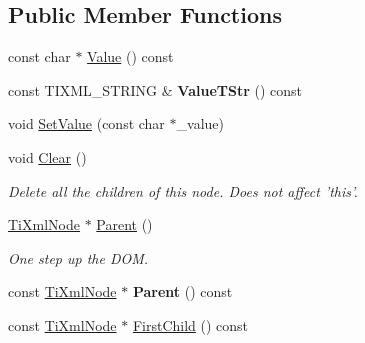 \subsection*{Public Member Functions}
\begin{DoxyCompactItemize}
\item 
const char $\ast$ \hyperlink{class_ti_xml_node_a77943eb90d12c2892b1337a9f5918b41}{Value} () const 
\item 
\hypertarget{class_ti_xml_node_a83ece13d2ea66dac66e0b21332229239}{const T\-I\-X\-M\-L\-\_\-\-S\-T\-R\-I\-N\-G \& {\bfseries Value\-T\-Str} () const }\label{class_ti_xml_node_a83ece13d2ea66dac66e0b21332229239}

\item 
void \hyperlink{class_ti_xml_node_a2a38329ca5d3f28f98ce932b8299ae90}{Set\-Value} (const char $\ast$\-\_\-value)
\item 
\hypertarget{class_ti_xml_node_a708e7f953df61d4d2d12f73171550a4b}{void \hyperlink{class_ti_xml_node_a708e7f953df61d4d2d12f73171550a4b}{Clear} ()}\label{class_ti_xml_node_a708e7f953df61d4d2d12f73171550a4b}

\begin{DoxyCompactList}\small\item\em Delete all the children of this node. Does not affect 'this'. \end{DoxyCompactList}\item 
\hypertarget{class_ti_xml_node_ab643043132ffd794f8602685d34a982e}{\hyperlink{class_ti_xml_node}{Ti\-Xml\-Node} $\ast$ \hyperlink{class_ti_xml_node_ab643043132ffd794f8602685d34a982e}{Parent} ()}\label{class_ti_xml_node_ab643043132ffd794f8602685d34a982e}

\begin{DoxyCompactList}\small\item\em One step up the D\-O\-M. \end{DoxyCompactList}\item 
\hypertarget{class_ti_xml_node_a78878709e53066f06eb4fcbcdd3a5260}{const \hyperlink{class_ti_xml_node}{Ti\-Xml\-Node} $\ast$ {\bfseries Parent} () const }\label{class_ti_xml_node_a78878709e53066f06eb4fcbcdd3a5260}

\item 
\hypertarget{class_ti_xml_node_a44c8eee26bbe2d1b2762038df9dde2f0}{const \hyperlink{class_ti_xml_node}{Ti\-Xml\-Node} $\ast$ \hyperlink{class_ti_xml_node_a44c8eee26bbe2d1b2762038df9dde2f0}{First\-Child} () const }\label{class_ti_xml_node_a44c8eee26bbe2d1b2762038df9dde2f0}


\end{DoxyCompactItemize}
